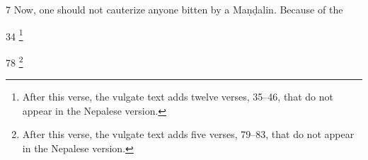 \begin{translation}
\item[7]
Now, one should not cauterize anyone bitten by a Maṇḍalin.  Because of the 



    
    
    \item[34] \footnote{After this verse, the vulgate text adds twelve
    verses, 35--46, that do not appear in the Nepalese version.}
    
     \item[78] \footnote{After this verse, the vulgate text adds five
        verses, 79--83, that do not appear in the Nepalese version.}
\end{translation}    
